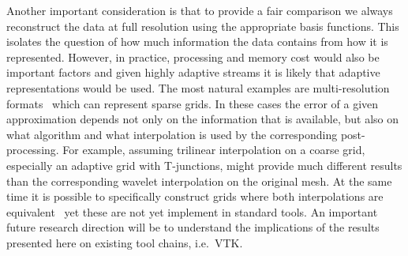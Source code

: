 Another important consideration is that to provide a fair comparison we always reconstruct the data at full resolution using the appropriate basis functions. 
This isolates the question of how much information the data contains from how it is represented. 
However, in practice, processing and memory cost would also be important factors and given highly adaptive streams it is likely that adaptive representations would be used. 
The most natural examples are multi-resolution formats~\cite{gigavoxels,Gobbetti2008,vdb2013} which can represent sparse grids. 
In these cases the error of a given approximation depends not only on the information that is available, but also on what algorithm and what interpolation is used by the corresponding post-processing. 
For example, assuming trilinear interpolation on a coarse grid, especially an adaptive grid with T-junctions, might provide much different results than the corresponding wavelet interpolation on the original mesh. 
At the same time it is possible to specifically construct grids where both interpolations are equivalent~\cite{weiss} yet these are not yet implement in standard tools. 
An important future research direction will be to understand the implications of the results presented here on existing tool chains, i.e.\ VTK. 






